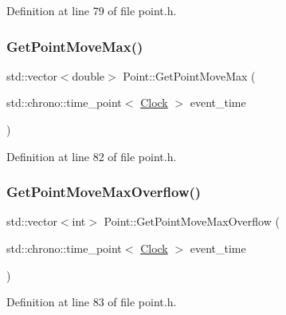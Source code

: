 Definition at line 79 of file point.\+h.

\mbox{\label{class_point_af67ce3da60a8e3907df6ec193786c2ae}} 
\subsubsection{\texorpdfstring{Get\+Point\+Move\+Max()}{GetPointMoveMax()}}
{\footnotesize\ttfamily std\+::vector$<$double$>$ Point\+::\+Get\+Point\+Move\+Max (\begin{DoxyParamCaption}\item[{std\+::chrono\+::time\+\_\+point$<$ \hyperlink{universe_8h_a0ef8d951d1ca5ab3cfaf7ab4c7a6fd80}{Clock} $>$}]{event\+\_\+time }\end{DoxyParamCaption})\hspace{0.3cm}{\ttfamily [inline]}}



Definition at line 82 of file point.\+h.

\mbox{\label{class_point_a83e3715d429ab2099f0c421d46603004}} 
\subsubsection{\texorpdfstring{Get\+Point\+Move\+Max\+Overflow()}{GetPointMoveMaxOverflow()}}
{\footnotesize\ttfamily std\+::vector$<$int$>$ Point\+::\+Get\+Point\+Move\+Max\+Overflow (\begin{DoxyParamCaption}\item[{std\+::chrono\+::time\+\_\+point$<$ \hyperlink{universe_8h_a0ef8d951d1ca5ab3cfaf7ab4c7a6fd80}{Clock} $>$}]{event\+\_\+time }\end{DoxyParamCaption})\hspace{0.3cm}{\ttfamily [inline]}}



Definition at line 83 of file point.\+h.

\mbox{\label{class_point_a92d41c8cd9a07ef56223839a44f54fe8}} 
